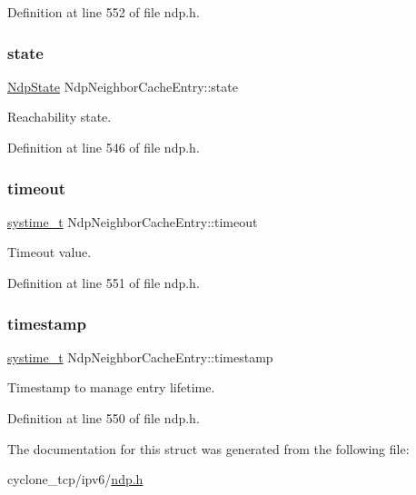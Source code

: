 Definition at line 552 of file ndp.\+h.

\mbox{\label{structNdpNeighborCacheEntry_a574ecea20d21d33352612dcd9583e3d5}} 
\subsubsection{\texorpdfstring{state}{state}}
{\footnotesize\ttfamily \hyperlink{ndp_8h_a97a48b3286230efa6a168a56910ea479}{Ndp\+State} Ndp\+Neighbor\+Cache\+Entry\+::state}



Reachability state. 



Definition at line 546 of file ndp.\+h.

\mbox{\label{structNdpNeighborCacheEntry_a315eba9b9511bfbfc60b9559b37e7070}} 
\subsubsection{\texorpdfstring{timeout}{timeout}}
{\footnotesize\ttfamily \hyperlink{compiler__port_8h_ae3e32a98d431a02106616da3071832dd}{systime\+\_\+t} Ndp\+Neighbor\+Cache\+Entry\+::timeout}



Timeout value. 



Definition at line 551 of file ndp.\+h.

\mbox{\label{structNdpNeighborCacheEntry_a09717542b16d54caabb3494f39b8864c}} 
\subsubsection{\texorpdfstring{timestamp}{timestamp}}
{\footnotesize\ttfamily \hyperlink{compiler__port_8h_ae3e32a98d431a02106616da3071832dd}{systime\+\_\+t} Ndp\+Neighbor\+Cache\+Entry\+::timestamp}



Timestamp to manage entry lifetime. 



Definition at line 550 of file ndp.\+h.



The documentation for this struct was generated from the following file\+:\begin{DoxyCompactItemize}
\item 
cyclone\+\_\+tcp/ipv6/\hyperlink{ndp_8h}{ndp.\+h}\end{DoxyCompactItemize}
